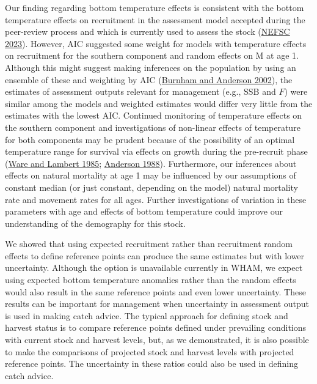 \documentclass[
]{article}
\begin{document}
Our finding regarding bottom temperature effects is consistent with the bottom temperature effects on recruitment in the assessment model accepted during the peer-review process and which is currently used to assess the stock (\protect\hyperlink{ref-nefsc23}{NEFSC 2023}). However, AIC suggested some weight for models with temperature effects on recruitment for the southern component and random effects on M at age 1. Although this might suggest making inferences on the population by using an ensemble of these and weighting by AIC (\protect\hyperlink{ref-burnhamanderson02}{Burnham and Anderson 2002}), the estimates of assessment outputs relevant for management (e.g., SSB and \(F\)) were similar among the models and weighted estimates would differ very little from the estimates with the lowest AIC. Continued monitoring of temperature effects on the southern component and investigations of non-linear effects of temperature for both components may be prudent because of the possibility of an optimal temperature range for survival via effects on growth during the pre-recruit phase (\protect\hyperlink{ref-warelambert85}{Ware and Lambert 1985}; \protect\hyperlink{ref-anderson88}{Anderson 1988}). Furthermore, our inferences about effects on natural mortality at age 1 may be influenced by our assumptions of constant median (or just constant, depending on the model) natural mortality rate and movement rates for all ages. Further investigations of variation in these parameters with age and effects of bottom temperature could improve our understanding of the demography for this stock.

We showed that using expected recruitment rather than recruitment random effects to define reference points can produce the same estimates but with lower uncertainty. Although the option is unavailable currently in WHAM, we expect using expected bottom temperature anomalies rather than the random effects would also result in the same reference points and even lower uncertainty. These results can be important for management when uncertainty in assessment output is used in making catch advice. The typical approach for defining stock and harvest status is to compare reference points defined under prevailing conditions with current stock and harvest levels, but, as we demonstrated, it is also possible to make the comparisons of projected stock and harvest levels with projected reference points. The uncertainty in these ratios could also be used in defining catch advice.
\end{document}
